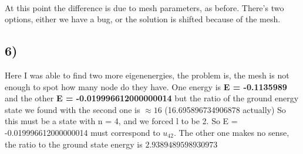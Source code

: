 \documentclass[10pt]{article}
\begin{document}
    \begin{center}
    \end{center}
    { \hspace*{\fill} \\}

    At this point the difference is due to mesh parameters, as before.
There's two options, either we have a bug, or the solution is shifted
because of the mesh.

    \subsection{6)}\label{section}

    Here I was able to find two more eigenenergies, the problem is, the mesh
is not enough to spot how many node do they have. One energy is
\textbf{E = -0.1135989} and the other \textbf{E = -0.019996612000000014}
but the ratio of the ground energy state we found with the second one is
\(\approx 16\) (16.695896734906878 actually) So this must be a state
with n = 4, and we forced l to be 2. So E = -0.019996612000000014 must
correspond to \(u_{42}\). The other one makes no sense, the ratio to the
ground state energy is \(2.9389489598930973\)
\end{document}
